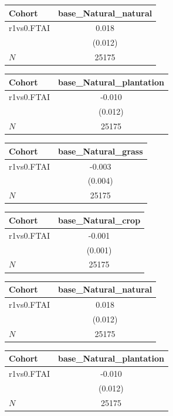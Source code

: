{
\def\sym#1{\ifmmode^{#1}\else\(^{#1}\)\fi}
\begin{tabular}{l*{1}{c}}
\toprule
Cohort    &base\_Natural\_natural   \\
\midrule
r1vs0.FTAI&    0.018   \\
          &  (0.012)   \\
\midrule
\(N\)     &    25175   \\
\bottomrule
\end{tabular}
}
{
\def\sym#1{\ifmmode^{#1}\else\(^{#1}\)\fi}
\begin{tabular}{l*{1}{c}}
\toprule
Cohort    &base\_Natural\_plantation   \\
\midrule
r1vs0.FTAI&   -0.010   \\
          &  (0.012)   \\
\midrule
\(N\)     &    25175   \\
\bottomrule
\end{tabular}
}
{
\def\sym#1{\ifmmode^{#1}\else\(^{#1}\)\fi}
\begin{tabular}{l*{1}{c}}
\toprule
Cohort    &base\_Natural\_grass   \\
\midrule
r1vs0.FTAI&   -0.003   \\
          &  (0.004)   \\
\midrule
\(N\)     &    25175   \\
\bottomrule
\end{tabular}
}
{
\def\sym#1{\ifmmode^{#1}\else\(^{#1}\)\fi}
\begin{tabular}{l*{1}{c}}
\toprule
Cohort    &base\_Natural\_crop   \\
\midrule
r1vs0.FTAI&   -0.001   \\
          &  (0.001)   \\
\midrule
\(N\)     &    25175   \\
\bottomrule
\end{tabular}
}
{
\def\sym#1{\ifmmode^{#1}\else\(^{#1}\)\fi}
\begin{tabular}{l*{1}{c}}
\toprule
Cohort    &base\_Natural\_natural   \\
\midrule
r1vs0.FTAI&    0.018   \\
          &  (0.012)   \\
\midrule
\(N\)     &    25175   \\
\bottomrule
\end{tabular}
}
{
\def\sym#1{\ifmmode^{#1}\else\(^{#1}\)\fi}
\begin{tabular}{l*{1}{c}}
\toprule
Cohort    &base\_Natural\_plantation   \\
\midrule
r1vs0.FTAI&   -0.010   \\
          &  (0.012)   \\
\midrule
\(N\)     &    25175   \\
\bottomrule
\end{tabular}
}
